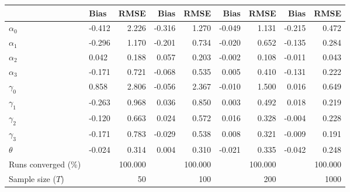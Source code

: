 
\begin{tabular}[t]{llrrrrrrr}
\toprule
  & Bias & RMSE & Bias & RMSE & Bias & RMSE & Bias & RMSE\\
\midrule
$\alpha_{0}$ & -0.412 & 2.226 & -0.316 & 1.270 & -0.049 & 1.131 & -0.215 & 0.472\\
$\alpha_{1}$ & -0.296 & 1.170 & -0.201 & 0.734 & -0.020 & 0.652 & -0.135 & 0.284\\
$\alpha_{2}$ & 0.042 & 0.188 & 0.057 & 0.203 & -0.002 & 0.108 & -0.011 & 0.043\\
$\alpha_{3}$ & -0.171 & 0.721 & -0.068 & 0.535 & 0.005 & 0.410 & -0.131 & 0.222\\
$\gamma_{0}$ & 0.858 & 2.806 & -0.056 & 2.367 & -0.010 & 1.500 & 0.016 & 0.649\\
$\gamma_{1}$ & -0.263 & 0.968 & 0.036 & 0.850 & 0.003 & 0.492 & 0.018 & 0.219\\
$\gamma_{2}$ & -0.120 & 0.663 & 0.024 & 0.572 & 0.016 & 0.328 & -0.004 & 0.228\\
$\gamma_{3}$ & -0.171 & 0.783 & -0.029 & 0.538 & 0.008 & 0.321 & -0.009 & 0.191\\
$\theta$ & -0.024 & 0.314 & 0.004 & 0.310 & -0.021 & 0.335 & -0.042 & 0.248\\
Runs converged (\%) &  & 100.000 &  & 100.000 &  & 100.000 &  & 100.000\\
Sample size ($T$) &  & 50 &  & 100 &  & 200 &  & 1000\\
\bottomrule
\end{tabular}
